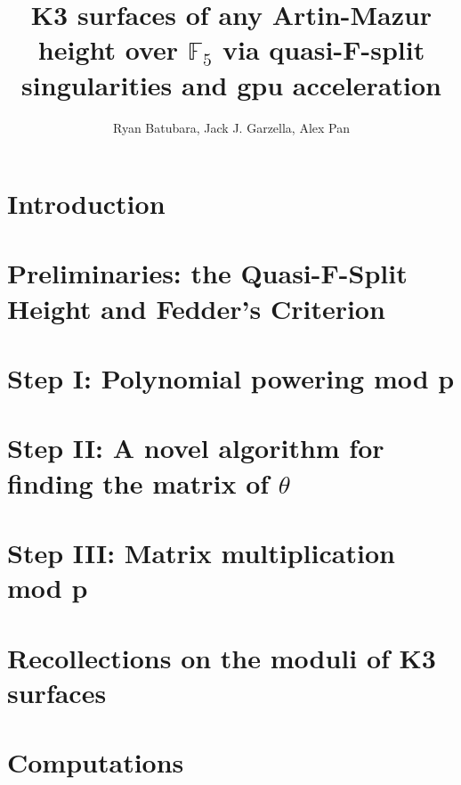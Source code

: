 \documentclass[a4paper]{article}
\title{K3 surfaces of any Artin-Mazur height over \(\mathbb{F}_{5}\) via quasi-F-split singularities and gpu acceleration}
\author{Ryan Batubara, Jack J. Garzella, Alex Pan}
\begin{document}
\maketitle

\section{Introduction}



\section{Preliminaries: the Quasi-F-Split Height and Fedder's Criterion}



\section{Step I: Polynomial powering mod p}



\section{Step II: A novel algorithm for finding the matrix of \(\theta\)}



\section{Step III: Matrix multiplication mod p}



\section{Recollections on the moduli of K3 surfaces}



\section{Computations}



\end{document}
